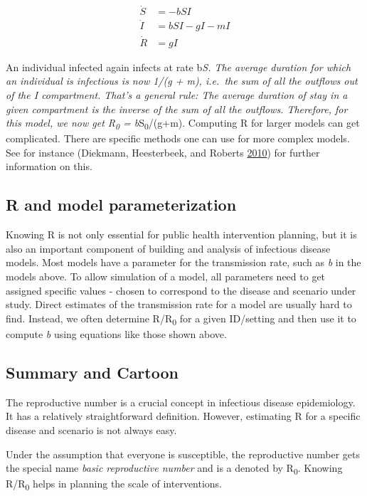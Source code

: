 \documentclass[]{article}
\theoremstyle{definition}
\theoremstyle{definition}
\theoremstyle{definition}
\theoremstyle{remark}
\begin{document}
\[ 
\begin{aligned}
\dot S &= -b SI \\
\dot I &= b S I - g I - m I\\
\dot R &= g I
\end{aligned}
\]

An individual infected again infects at rate b\emph{S. The average
duration for which an individual is infectious is now 1/(g + m),
i.e.~the sum of all the outflows out of the \emph{I} compartment. That's
a general rule: The average duration of stay in a given compartment is
the inverse of the sum of all the outflows. Therefore, for this model,
we now get R\textsubscript{0} = b}S\textsubscript{0}/(g+m). Computing R
for larger models can get complicated. There are specific methods one
can use for more complex models. See for instance (Diekmann,
Heesterbeek, and Roberts \protect\hyperlink{ref-diekmann10}{2010}) for
further information on this.

\subsection{R and model
parameterization}\label{r-and-model-parameterization}

Knowing R is not only essential for public health intervention planning,
but it is also an important component of building and analysis of
infectious disease models. Most models have a parameter for the
transmission rate, such as \emph{b} in the models above. To allow
simulation of a model, all parameters need to get assigned specific
values - chosen to correspond to the disease and scenario under study.
Direct estimates of the transmission rate for a model are usually hard
to find. Instead, we often determine R/R\textsubscript{0} for a given
ID/setting and then use it to compute \emph{b} using equations like
those shown above.

\subsection{Summary and Cartoon}\label{summary-and-cartoon-3}

The reproductive number is a crucial concept in infectious disease
epidemiology. It has a relatively straightforward definition. However,
estimating R for a specific disease and scenario is not always easy.

Under the assumption that everyone is susceptible, the reproductive
number gets the special name \emph{basic reproductive number} and is a
denoted by R\textsubscript{0}. Knowing R/R\textsubscript{0} helps in
planning the scale of interventions.
\end{document}
